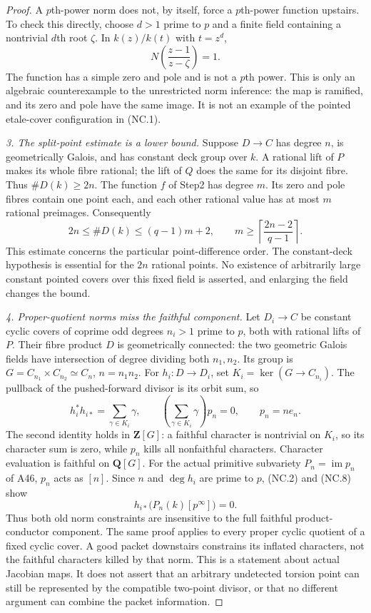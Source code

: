 \documentclass[11pt,a4paper]{article}
\begin{document}
\begin{proof}
A $p$th-power norm does not, by itself, force a $p$th-power
function upstairs. To check this directly, choose $d>1$
prime to $p$ and a finite field containing a nontrivial
$d$th root $\zeta$. In $k(z)/k(t)$ with $t=z^d$,
\[
                    N\!\left(\frac{z-1}{z-\zeta}\right)=1.
       \tag{NC.6}
\]
The function has a simple zero and pole and is not a $p$th
power. This is only an algebraic counterexample to the
unrestricted norm inference: the map is ramified, and its
zero and pole have the same image. It is not an example of
the pointed etale-cover configuration in (NC.1).

\emph{3. The split-point estimate is a lower bound.}
Suppose $D\to C$ has degree $n$, is geometrically Galois,
and has constant deck group over $k$. A rational lift of
$P$ makes its whole fibre rational; the lift of $Q$ does
the same for its disjoint fibre. Thus $\#D(k)\ge2n$.
The function $f$ of Step2 has degree $m$. Its zero and pole
fibres contain one point each, and each other rational value
has at most $m$ rational preimages. Consequently
\[
     2n\le\#D(k)\le(q-1)m+2,
     \qquad
     m\ge\left\lceil\frac{2n-2}{q-1}\right\rceil.
       \tag{NC.7}
\]
This estimate concerns the particular point-difference order.
The constant-deck hypothesis is essential for the $2n$
rational points. No existence of arbitrarily large constant
pointed covers over this fixed field is asserted, and
enlarging the field changes the bound.

\emph{4. Proper-quotient norms miss the faithful component.}
Let $D_i\to C$ be constant cyclic covers of coprime odd
degrees $n_i>1$ prime to $p$, both with rational lifts of $P$.
Their fibre product $D$ is geometrically connected: the two
geometric Galois fields have intersection of degree dividing
both $n_1,n_2$. Its group is
$G=C_{n_1}\times C_{n_2}\simeq C_n$, $n=n_1n_2$.
For $h_i:D\to D_i$, set $K_i=\ker(G\to C_{n_i})$.
The pullback of the pushed-forward divisor is its orbit sum,
so
\[
 h_i^*h_{i*}=\sum_{\gamma\in K_i}\gamma,
 \qquad
 \left(\sum_{\gamma\in K_i}\gamma\right)p_n=0,
 \qquad p_n=ne_n.
       \tag{NC.8}
\]
The second identity holds in $\mathbf Z[G]$: a faithful
character is nontrivial on $K_i$, so its character sum is
zero, while $p_n$ kills all nonfaithful characters.
Character evaluation is faithful on $\mathbf Q[G]$.
For the actual primitive subvariety $P_n=\operatorname{im}p_n$
of A46, $p_n$ acts as $[n]$. Since $n$ and $\deg h_i$ are
prime to $p$, (NC.2) and (NC.8) show
\[
                       h_{i*}\bigl(P_n(k)[p^\infty]\bigr)=0.
       \tag{NC.9}
\]
Thus both old norm constraints are insensitive to the full
faithful product-conductor component. The same proof applies
to every proper cyclic quotient of a fixed cyclic cover.
A good packet downstairs constrains its inflated characters,
not the faithful characters killed by that norm. This is a
statement about actual Jacobian maps. It does not assert that
an arbitrary undetected torsion point can still be represented
by the compatible two-point divisor, or that no different
argument can combine the packet information.


\end{proof}
\end{document}
